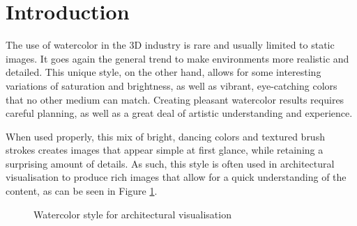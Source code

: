 \documentclass{article}
\begin{document}
\section{Introduction}
\label{sec:introduction}

The use of watercolor in the 3D industry is rare and usually limited to static images. 
It  goes again the general trend to make environments more realistic and detailed. This unique style, 
on the other hand, allows for some interesting variations of saturation and brightness, as well as vibrant, 
eye-catching colors that no other medium can match. Creating pleasant watercolor results requires 
careful planning, as well as a great deal of artistic understanding and experience. \medskip \par

\noindent
When used properly, this mix of bright, dancing colors and textured brush strokes creates images that appear 
simple at first glance, while retaining a surprising amount of details. As such, this style is often used in
architectural visualisation to produce rich images that allow for a quick understanding of the content, as can 
be seen in Figure \ref{fig:watercolor_architecture}.

\begin{figure}[h]
    \centering
    \hfill
    \caption{Watercolor style for architectural visualisation}
    \label{fig:watercolor_architecture}
\end{figure}
\end{document}
